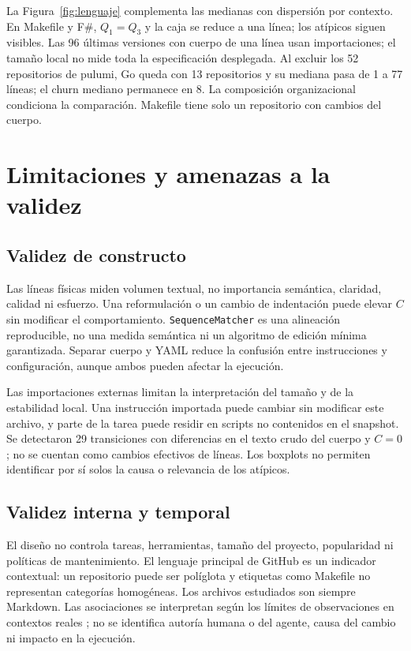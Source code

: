 \documentclass[conference,a4paper]{IEEEtran}
\begin{document}
La Figura~\ref{fig:lenguaje} complementa las medianas con dispersión por contexto. En Makefile y F\#, $Q_1=Q_3$ y la caja se reduce a una línea; los atípicos siguen visibles. Las 96 últimas versiones con cuerpo de una línea usan importaciones; el tamaño local no mide toda la especificación desplegada. Al excluir los 52 repositorios de pulumi, Go queda con 13 repositorios y su mediana pasa de 1 a 77 líneas; el churn mediano permanece en 8. La composición organizacional condiciona la comparación. Makefile tiene solo un repositorio con cambios del cuerpo.

\clearpage
\section{Limitaciones y amenazas a la validez}
\subsection{Validez de constructo}
Las líneas físicas miden volumen textual, no importancia semántica, claridad, calidad ni esfuerzo. Una reformulación o un cambio de indentación puede elevar $C$ sin modificar el comportamiento. \texttt{SequenceMatcher} es una alineación reproducible, no una medida semántica ni un algoritmo de edición mínima garantizada. Separar cuerpo y YAML reduce la confusión entre instrucciones y configuración, aunque ambos pueden afectar la ejecución.

Las importaciones externas limitan la interpretación del tamaño y de la estabilidad local. Una instrucción importada puede cambiar sin modificar este archivo, y parte de la tarea puede residir en scripts no contenidos en el snapshot. Se detectaron 29 transiciones con diferencias en el texto crudo del cuerpo y $C=0$; no se cuentan como cambios efectivos de líneas. Los boxplots no permiten identificar por sí solos la causa o relevancia de los atípicos.

\subsection{Validez interna y temporal}
El diseño no controla tareas, herramientas, tamaño del proyecto, popularidad ni políticas de mantenimiento. El lenguaje principal de GitHub es un indicador contextual: un repositorio puede ser políglota y etiquetas como Makefile no representan categorías homogéneas. Los archivos estudiados son siempre Markdown. Las asociaciones se interpretan según los límites de observaciones en contextos reales \cite{stol2018}; no se identifica autoría humana o del agente, causa del cambio ni impacto en la ejecución.
\end{document}
